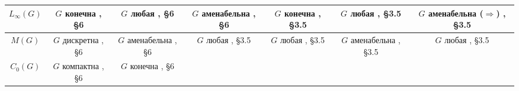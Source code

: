 \documentclass{article}
\numberwithin{equation}{section}
\theoremstyle{plain}
\theoremstyle{definition}
\begin{document}
\begin{fulltext}
\begin{table}[ht]
\begin{tiny}
{\begin{tabular}{|c|c|c|c|c|c|c|}
            \hline
                $L_\infty(G)$ & 
                \shortstack{
                    $G$ конечна \\
					{\cite{DalPolHomolPropGrAlg}, \S 6}
                } & 
                \shortstack{
                    $G$ любая \\
					{\cite{DalPolHomolPropGrAlg}, \S 6}
                } & 
                \shortstack{
                    $G$ аменабельна \\
					{\cite{DalPolHomolPropGrAlg}, \S 6}
                } & 
                \shortstack{
                    $G$ конечна \\
					{\cite{RamsHomPropSemgroupAlg}, \S 3.5}
                } & 
                \shortstack{
                    $G$ любая \\
					{\cite{RamsHomPropSemgroupAlg}, \S 3.5}
                } & 
                \shortstack{
                    $G$ аменабельна \\ ($\Longrightarrow$)
					{\cite{RamsHomPropSemgroupAlg}}, \S 3.5
                } \\ 
            \hline
                $M(G)$ & 
                \shortstack{
                    $G$ дискретна \\
					{\cite{DalPolHomolPropGrAlg}, \S 6}
                } & 
                \shortstack{
                    $G$ аменабельна \\
					{\cite{DalPolHomolPropGrAlg}, \S 6}
                } & 
                \shortstack{
                    $G$ любая \\
					{\cite{RamsHomPropSemgroupAlg}, \S 3.5}
                } & 
                \shortstack{
                    $G$ любая \\
					{\cite{RamsHomPropSemgroupAlg}, \S 3.5}
                } & 
                \shortstack{
                    $G$ аменабельна \\
					{\cite{RamsHomPropSemgroupAlg}, \S 3.5}
                } & 
                \shortstack{
                    $G$ любая \\
					{\cite{RamsHomPropSemgroupAlg}, \S 3.5}
                } \\ 
            \hline
                $C_0(G)$ & 
                \shortstack{
                    $G$ компактна \\
					{\cite{DalPolHomolPropGrAlg}, \S 6}
                } & 
                \shortstack{
                    $G$ конечна \\
					{\cite{DalPolHomolPropGrAlg}, \S 6}
                } & 

\end{tabular}}
\end{tiny}
\end{table}
\end{fulltext}
\end{document}
